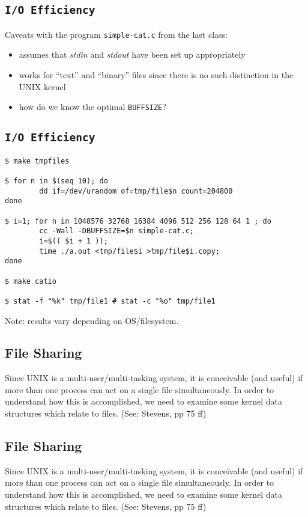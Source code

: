 \documentclass[xga]{xdvislides}
\begin{document}
\subsection{{\tt I/O Efficiency}}
Caveats with the program {\tt simple-cat.c} from the last class:
\begin{itemize}
	\item assumes that {\em stdin} and {\em stdout} have been set up
		appropriately
	\item works for ``text'' and ``binary'' files since there is no such
		distinction in the UNIX kernel
	\item how do we know the optimal {\tt BUFFSIZE}?
\end{itemize}

\subsection{{\tt I/O Efficiency}}
\begin{verbatim}
$ make tmpfiles

$ for n in $(seq 10); do
        dd if=/dev/urandom of=tmp/file$n count=204800
done

$ i=1; for n in 1048576 32768 16384 4096 512 256 128 64 1 ; do
        cc -Wall -DBUFFSIZE=$n simple-cat.c;
        i=$(( $i + 1 ));
        time ./a.out <tmp/file$i >tmp/file$i.copy;
done

$ make catio

$ stat -f "%k" tmp/file1 # stat -c "%o" tmp/file1
\end{verbatim}

Note: results vary depending on OS/filesystem.

\subsection{File Sharing}
Since UNIX is a multi-user/multi-tasking system, it is conceivable (and
useful) if more than one process can act on a single file simultaneously. In
order to understand how this is accomplished, we need to examine some kernel
data structures which relate to files.  (See: Stevens, pp 75 ff)

\subsection{File Sharing}
Since UNIX is a multi-user/multi-tasking system, it is conceivable (and
useful) if more than one process can act on a single file simultaneously. In
order to understand how this is accomplished, we need to examine some kernel
data structures which relate to files.  (See: Stevens, pp 75 ff)
\end{document}
